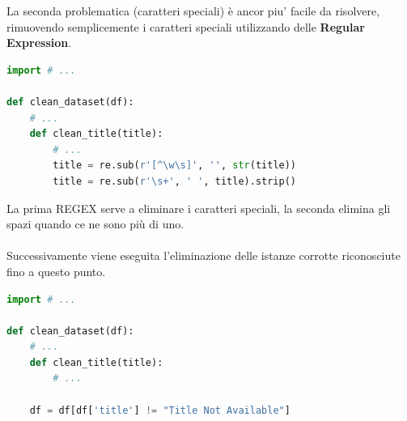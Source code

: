 \documentclass[a4paper,12pt]{report}
\begin{document}
La seconda problematica (caratteri speciali) è ancor piu' facile da risolvere, rimuovendo semplicemente i caratteri speciali utilizzando delle \textbf{Regular Expression}.
\begin{lstlisting}[language=Python]
import # ...

def clean_dataset(df):
    # ...
    def clean_title(title):
        # ...
        title = re.sub(r'[^\w\s]', '', str(title))
        title = re.sub(r'\s+', ' ', title).strip()
\end{lstlisting}
La prima REGEX serve a eliminare i caratteri speciali, la seconda elimina gli spazi quando ce ne sono più di uno.\\
\\
Successivamente viene eseguita l'eliminazione delle istanze corrotte riconosciute fino a questo punto.
\begin{lstlisting}[language=Python]
import # ...

def clean_dataset(df):
    # ...
    def clean_title(title):
        # ...
        
    df = df[df['title'] != "Title Not Available"]
\end{lstlisting}
\newpage
\end{document}
